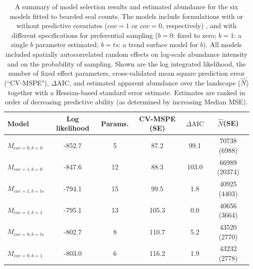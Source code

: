 \documentclass[times,mee,doublespace,]{besauth2}
\begin{document}
\pagebreak
\begin{table}[ht]
\caption{A summary of model selection results and estimated abundance for the six models fitted to bearded seal counts.  The models include formulations with or without predictive covariates ($cov=1$ or $cov=0$, respectively) , and with different specifications for preferential sampling ($b=0$: fixed to zero; $b=1$: a single $b$ parameter estimated; $b=ts$: a trend surface model for $b$).  All models included spatially autocorrelated random effects on log-scale abundance intensity and on the probability of sampling.  Shown are the log integrated likelihood, the number of fixed effect parameters, cross-validated mean square prediction error (``CV-MSPE"), $\Delta \textrm{AIC}$, and estimated apparent abundance over the landscape ($\hat{N}$) together with a Hessian-based standard error estimate.  Estimates are ranked in order of decreasing predictive ability (as determined by increasing Median MSE).
}
\label{tab:aic}
\raggedright
\begin{tabular}{lccccc}
  \hline
  Model & Log likelihood & Params. & CV-MSPE (SE)& $\Delta \textrm{AIC}$ & $\hat{N}$(SE) \\
  \hline
 $M_{cov=0,b=0}$ & -852.7 & 5 & 87.2 & 99.1 & 70738 (6988) \\
 $M_{cov=1,b=0}$ & -847.6 & 12 & 88.3 & 103.0 & 66989 (20374) \\
 $M_{cov=1,b=ts}$ & -794.1 & 15 & 99.5 & 1.8 & 40925 (4403) \\
 $M_{cov=1,b=1}$ & -795.1 & 13 & 105.3 & 0.0 & 40656 (3664) \\
 $M_{cov=0,b=ts}$ & -802.7 & 8 &  110.7 & 5.2 & 43520 (2770)  \\
 $M_{cov=0,b=1}$ & -803.0 & 6 & 116.2 & 1.9 & 43232 (2778) \\
  \hline
\end{tabular}
\\
\end{table}

\pagebreak
\end{document}
